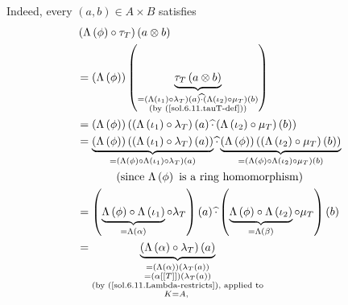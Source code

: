\documentclass[numbers=enddot,12pt,final,onecolumn,notitlepage]{scrartcl}%
\begin{document}
Indeed, every $\left(  a,b\right)  \in A\times B$ satisfies%
\begin{align*}
&  \left(  \Lambda\left(  \phi\right)  \circ\tau_{T}\right)  \left(  a\otimes
b\right) \\
&  =\left(  \Lambda\left(  \phi\right)  \right)  \left(  \underbrace{\tau
_{T}\left(  a\otimes b\right)  }_{\substack{=\left(  \Lambda\left(  \iota
_{1}\right)  \circ\lambda_{T}\right)  \left(  a\right)  \widehat{\cdot}\left(
\Lambda\left(  \iota_{2}\right)  \circ\mu_{T}\right)  \left(  b\right)
\\\text{(by (\ref{sol.6.11.tauT-def}))}}}\right) \\
&  =\left(  \Lambda\left(  \phi\right)  \right)  \left(  \left(
\Lambda\left(  \iota_{1}\right)  \circ\lambda_{T}\right)  \left(  a\right)
\widehat{\cdot}\left(  \Lambda\left(  \iota_{2}\right)  \circ\mu_{T}\right)
\left(  b\right)  \right) \\
&  =\underbrace{\left(  \Lambda\left(  \phi\right)  \right)  \left(  \left(
\Lambda\left(  \iota_{1}\right)  \circ\lambda_{T}\right)  \left(  a\right)
\right)  }_{=\left(  \Lambda\left(  \phi\right)  \circ\Lambda\left(  \iota
_{1}\right)  \circ\lambda_{T}\right)  \left(  a\right)  }\widehat{\cdot
}\underbrace{\left(  \Lambda\left(  \phi\right)  \right)  \left(  \left(
\Lambda\left(  \iota_{2}\right)  \circ\mu_{T}\right)  \left(  b\right)
\right)  }_{=\left(  \Lambda\left(  \phi\right)  \circ\Lambda\left(  \iota
_{2}\right)  \circ\mu_{T}\right)  \left(  b\right)  }\\
&  \ \ \ \ \ \ \ \ \ \ \left(  \text{since }\Lambda\left(  \phi\right)  \text{
is a ring homomorphism}\right) \\
&  =\left(  \underbrace{\Lambda\left(  \phi\right)  \circ\Lambda\left(
\iota_{1}\right)  }_{=\Lambda\left(  \alpha\right)  }\circ\lambda_{T}\right)
\left(  a\right)  \widehat{\cdot}\left(  \underbrace{\Lambda\left(
\phi\right)  \circ\Lambda\left(  \iota_{2}\right)  }_{=\Lambda\left(
\beta\right)  }\circ\mu_{T}\right)  \left(  b\right) \\
&  =\underbrace{\left(  \Lambda\left(  \alpha\right)  \circ\lambda_{T}\right)
\left(  a\right)  }_{\substack{=\left(  \Lambda\left(  \alpha\right)  \right)
\left(  \lambda_{T}\left(  a\right)  \right)  \\=\left(  \alpha\left[  \left[
T\right]  \right]  \right)  \left(  \lambda_{T}\left(  a\right)  \right)
\\\text{(by (\ref{sol.6.11.Lambda-restricts}), applied to}\\K=A\text{,
}}}
\end{align*}
\end{document}
